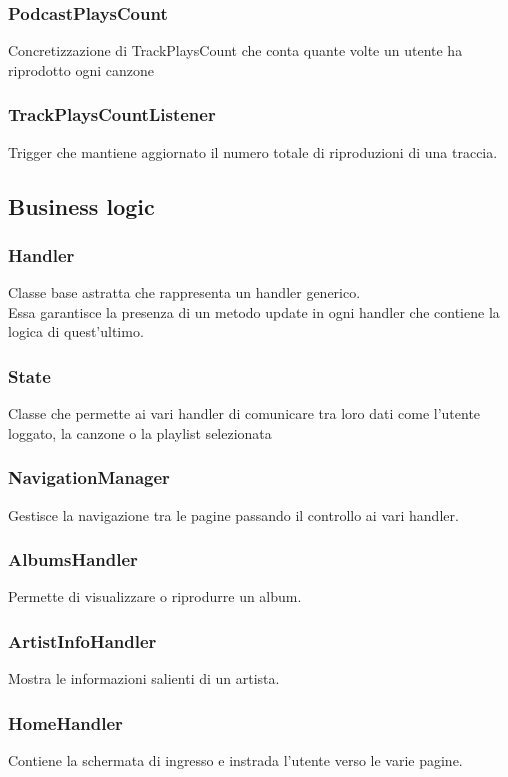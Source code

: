 \documentclass{article}
\begin{document}
  \subsubsection{PodcastPlaysCount}
  Concretizzazione di TrackPlaysCount che conta quante volte un utente ha riprodotto ogni canzone

  \subsubsection{TrackPlaysCountListener}
  Trigger che mantiene aggiornato il numero totale di riproduzioni di una traccia.

  \subsection{Business logic}

  \subsubsection{Handler}
  Classe base astratta che rappresenta un handler generico.\\
  Essa garantisce la presenza di un metodo update in ogni handler che contiene la logica di quest'ultimo.
  \subsubsection{State}
  Classe che permette ai vari handler di comunicare tra loro dati come
  l'utente loggato, la canzone o la playlist selezionata
  \subsubsection{NavigationManager}
  Gestisce la navigazione tra le pagine passando il controllo ai vari handler.
  \subsubsection{AlbumsHandler}
  Permette di visualizzare o riprodurre un album.
  \subsubsection{ArtistInfoHandler}
  Mostra le informazioni salienti di un artista.
  \subsubsection{HomeHandler}
  Contiene la schermata di ingresso e instrada l'utente verso le varie pagine.
\end{document}
